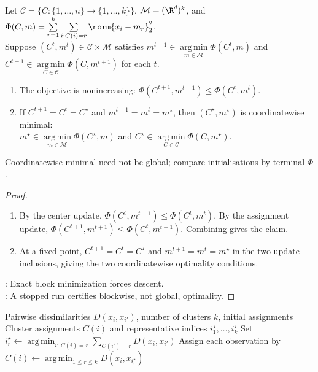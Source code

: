 \begin{proposition} \label{prop:sl-kmeans-descent-local-minima} \\
Let $\mathcal C=\{C:\{1,\ldots,n\}\to\{1,\ldots,k\}\}$, $\mathcal M=(\R^d)^k$, and $\Phi(C,m)=\sum\limits_{r=1}^k\sum\limits_{i:C(i)=r}\norm{x_i-m_r}_2^2$.\\
Suppose $(C^t,m^t)\in\mathcal C\times\mathcal M$ satisfies $m^{t+1}\in\operatorname*{arg\,min}\limits_{m\in\mathcal M}\Phi(C^t,m)$ and $C^{t+1}\in\operatorname*{arg\,min}\limits_{C\in\mathcal C}\Phi(C,m^{t+1})$ for each $t$.
\begin{enumerate}[label=(\roman*)]
\setlength{\itemsep}{0pt}
\item The objective is nonincreasing: $\Phi(C^{t+1},m^{t+1})\leq\Phi(C^t,m^t)$.
\item If $C^{t+1}=C^t=C^\star$ and $m^{t+1}=m^t=m^\star$, then $(C^\star,m^\star)$ is coordinatewise minimal:\\
$m^\star\in\operatorname*{arg\,min}\limits_{m\in\mathcal M}\Phi(C^\star,m)$ and $C^\star\in\operatorname*{arg\,min}\limits_{C\in\mathcal C}\Phi(C,m^\star)$.
\end{enumerate}
Coordinatewise minimal need not be global; compare initialisations by terminal $\Phi$.
\end{proposition}
\begin{proof}
\begin{enumerate}[label=(\roman*)]
\setlength{\itemsep}{0pt}
\item By the center update, $\Phi(C^t,m^{t+1})\leq\Phi(C^t,m^t)$. By the assignment update, $\Phi(C^{t+1},m^{t+1})\leq\Phi(C^t,m^{t+1})$. Combining gives the claim.
\item At a fixed point, $C^{t+1}=C^t=C^\star$ and $m^{t+1}=m^t=m^\star$ in the two update inclusions, giving the two coordinatewise optimality conditions.
\end{enumerate}
: Exact block minimization forces descent.\\
: A stopped run certifies blockwise, not global, optimality.
\end{proof}

\begin{breakablealgorithm}
\caption{$k$-Medoids Alternating Representatives}
\label{alg:sl-kmedoids-alternating-representatives}
\begin{algorithmic}
\Require Pairwise dissimilarities $D(x_i,x_{i'})$, number of clusters $k$, initial assignments
\Ensure Cluster assignments $C(i)$ and representative indices $i_1^\star,\ldots,i_k^\star$
\Repeat
{}
\State Set $i_r^\star\gets \operatorname*{arg\,min}_{i:\,C(i)=r}\sum_{C(i')=r}D(x_i,x_{i'})$
\EndFor
\State Assign each observation by $C(i)\gets \operatorname*{arg\,min}_{1\leq r\leq k}D(x_i,x_{i_r^\star})$
\end{algorithmic}
\end{breakablealgorithm}

